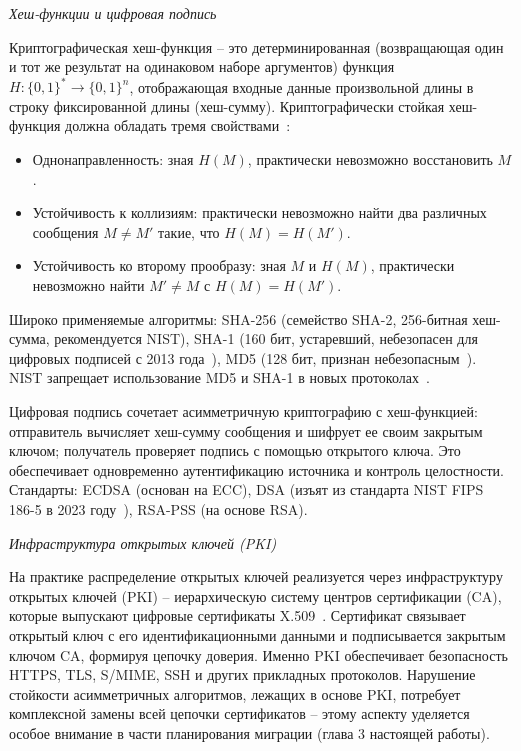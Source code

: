 \documentclass{itmo-vkr}
\begin{document}
	
	\textit{Хеш-функции и цифровая подпись}
	
	Криптографическая хеш-функция -- это детерминированная (возвращающая один и тот же результат на одинаковом наборе аргументов) функция $H : \{0, 1\}^* \rightarrow \{0, 1\}^n$, отображающая входные данные произвольной длины в строку фиксированной длины (хеш-сумму). Криптографически стойкая хеш-функция должна обладать тремя свойствами~\cite{menezes1996handbook}:
	
	
	\begin{itemize}
		\item Однонаправленность: зная $H(M)$, практически невозможно восстановить $M$.
		\item Устойчивость к коллизиям: практически невозможно найти два различных сообщения $M \neq M'$ такие, что $H(M) = H(M')$.
		\item Устойчивость ко второму прообразу: зная $M$ и $H(M)$, практически невозможно найти $M' \neq M$ с $H(M) = H(M')$.
	\end{itemize}
	
	Широко применяемые алгоритмы: SHA-256 (семейство SHA-2, 256-битная хеш-сумма, рекомендуется NIST), SHA-1 (160 бит, устаревший, небезопасен для цифровых подписей с 2013 года~\cite{nist-sp800131a}), MD5 (128 бит, признан небезопасным~\cite{nist-sp800131a}). NIST запрещает использование MD5 и SHA-1 в новых протоколах~\cite{nist-ir8547}.
	
	Цифровая подпись сочетает асимметричную криптографию с хеш-функцией: отправитель вычисляет хеш-сумму сообщения и шифрует ее своим закрытым ключом; получатель проверяет подпись с помощью открытого ключа. Это обеспечивает одновременно аутентификацию источника и контроль целостности. Стандарты: ECDSA (основан на ECC), DSA (изъят из стандарта NIST FIPS 186-5 в 2023 году~\cite{nist-fips186-5}), RSA-PSS (на основе RSA).
	
	\textit{Инфраструктура открытых ключей (PKI)}
	
	На практике распределение открытых ключей реализуется через инфраструктуру открытых ключей (PKI) -- иерархическую систему центров сертификации (CA), которые выпускают цифровые сертификаты X.509~\cite{stallings2022cryptography}. Сертификат связывает открытый ключ с его идентификационными данными и подписывается закрытым ключом CA, формируя цепочку доверия. Именно PKI обеспечивает безопасность HTTPS, TLS, S/MIME, SSH и других прикладных протоколов. Нарушение стойкости асимметричных алгоритмов, лежащих в основе PKI, потребует комплексной замены всей цепочки сертификатов -- этому аспекту уделяется особое внимание в части планирования миграции (глава 3 настоящей работы).
	
\end{document}
